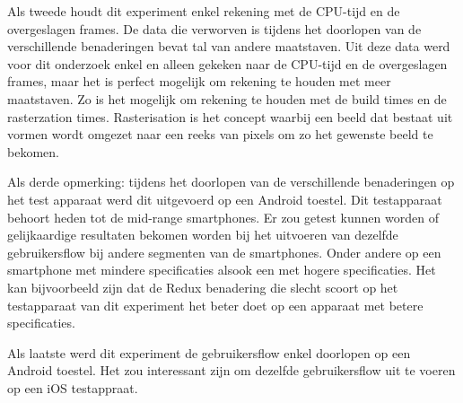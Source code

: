 Als tweede houdt dit experiment enkel rekening met de CPU-tijd en de overgeslagen frames. De data die verworven is tijdens het doorlopen van de verschillende benaderingen bevat tal van andere maatstaven. Uit deze data werd voor dit onderzoek enkel en alleen gekeken naar de CPU-tijd en de overgeslagen frames, maar het is perfect mogelijk om rekening te houden met meer maatstaven. Zo is het mogelijk om rekening te houden met de build times en de rasterzation times. Rasterisation is het concept waarbij een beeld dat bestaat uit vormen wordt omgezet naar een reeks van pixels om zo het gewenste beeld te bekomen. \newline

Als derde opmerking: tijdens het doorlopen van de verschillende benaderingen op het test apparaat werd dit uitgevoerd op een Android toestel. Dit testapparaat behoort heden tot de mid-range smartphones. Er zou getest kunnen worden of gelijkaardige resultaten bekomen worden bij het uitvoeren van dezelfde gebruikersflow bij andere segmenten van de smartphones. Onder andere op een smartphone met mindere specificaties alsook een met hogere specificaties. Het kan bijvoorbeeld zijn dat de Redux benadering die slecht scoort op het testapparaat van dit experiment het beter doet op een apparaat met betere specificaties. 

Als laatste werd dit experiment de gebruikersflow enkel doorlopen op een Android toestel. Het zou interessant zijn om dezelfde gebruikersflow uit te voeren op een iOS testappraat. 

